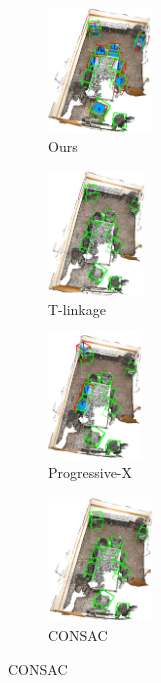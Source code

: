 \begin{figure}[ht]
      
      \begin{subfigure}{0.18\textwidth}
        \centering
        \includegraphics[height=3.3cm]{images/scan2cad-cad-ours.png}
          \caption{Ours}
          \label{fig:scan2cad_cad-result}
      \end{subfigure}
      \begin{subfigure}{0.18\textwidth}
        \centering
        \includegraphics[height=3.3cm]{images/scan2cad-cad-tlinkage.png}
          \caption{T-linkage\cite{Tlinkage}}
          \label{fig:scan2cad_cad-tlinkage}
      \end{subfigure}
      \begin{subfigure}{0.19\textwidth}
        \centering
        \includegraphics[height=3.3cm]{images/scan2cad-cad-progx.png}
          \caption{Progressive-X\cite{ProgressiveX}}
          \label{fig:scan2cad_cad-prox}
      \end{subfigure}
      \begin{subfigure}{0.17\textwidth}
        \centering
        \includegraphics[height=3.3cm]{images/scan2cad-cad-consac.png}
          \caption{CONSAC\cite{CONSAC}}

\end{subfigure}
\end{figure}
